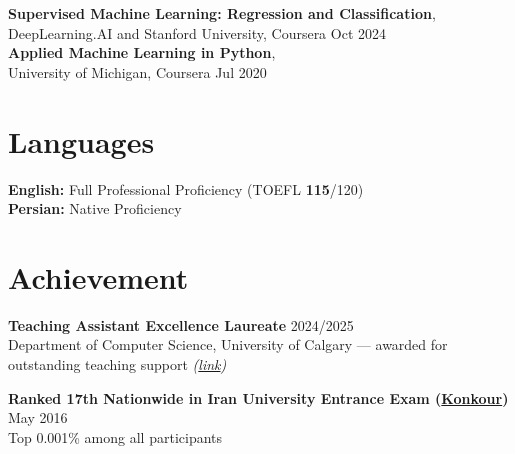 \documentclass[a4paper,10pt]{article}
\begin{document}
\textbf{Supervised Machine Learning: Regression and Classification},\\
DeepLearning.AI and Stanford University, Coursera
\hfill Oct 2024 \\
\textbf{Applied Machine Learning in Python},\\
University of Michigan, Coursera
\hfill Jul 2020


\section*{Languages}

\textbf{English:} Full Professional Proficiency (TOEFL \textbf{115}/120) \\
\textbf{Persian:} Native Proficiency

\section*{Achievement}

\textbf{Teaching Assistant Excellence Laureate} \hfill 2024/2025 \\
Department of Computer Science, University of Calgary --- awarded for outstanding teaching support \textit{(\href{https://science.ucalgary.ca/computer-science/about/our-department/ta-recognition-2024-2025}{link})}

\vspace{0.35em}

\textbf{Ranked 17th Nationwide in Iran University Entrance Exam (\href{https://en.wikipedia.org/wiki/Iranian_University_Entrance_Exam}{Konkour})} \hfill May 2016 \\
Top 0.001\% among all participants
\end{document}
